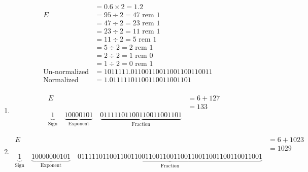 \documentclass[12pt letter]{report}
\begin{document}
{{\begin{align*}
                           & = 0.6 \times 2 = 1.2                       \\
      E                    & = 95 \div 2 = 47 \text{ rem } 1            \\
                           & = 47 \div 2 = 23 \text{ rem } 1            \\
                           & = 23 \div 2 = 11 \text{ rem } 1            \\
                           & = 11 \div 2 = 5 \text{ rem } 1             \\
                           & = 5 \div 2 = 2 \text{ rem } 1              \\
                           & = 2 \div 2 = 1 \text{ rem } 0              \\
                           & = 1 \div 2 = 0 \text{ rem } 1              \\
      \text{Un-normalized} & = 1011111.01100110011001100110011          \\
      \text{Normalized}    & = 1.01111101100110011001101 \tag*{Rounded} \\
    \end{align*}
    \begin{enumerate}
      \item
            \begin{align*}
              E & = 6 + 127 \\
                & = 133     \\
              \underbrace{1}_{\text{Sign}} \quad
              \underbrace{10000101}_{\text{Exponent}} \quad
              \underbrace{01111101100110011001101}_{\text{Fraction}}
            \end{align*}

      \item
            \begin{align*}
              E & = 6 + 1023 \\
                & = 1029     \\
              \underbrace{1}_{\text{Sign}} \quad
              \underbrace{10000000101}_{\text{Exponent}} \quad
              \underbrace{0111110110011001100110011001100110011001100110011001}_{\text{Fraction}}
            \end{align*}
    \end{enumerate}
  }
}

\end{document}
